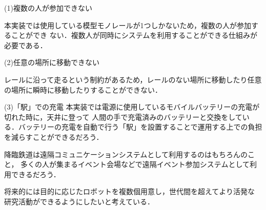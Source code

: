 \documentclass[submit,techreq]{ipsj}
\begin{document}
(1)複数の人が参加できない

本実装では使用している模型モノレールが1つしかないため，複数の人が参加することができ
ない．複数人が同時にシステムを利用することができる仕組みが必要である．

(2)任意の場所に移動できない

レールに沿って走るという制約があるため，レールのない場所に移動したり任意の場所に瞬時に移動したりすることができない．

(3)「駅」での充電
本実装では電源に使用しているモバイルバッテリーの充電が切れた時に，天井に登って
人間の手で充電済みのバッテリーと交換をしている．バッテリーの充電を自動で行う「駅」を設置することで運用する上での負担を減らすことができるだろう．

降臨鉄道は遠隔コミュニケーションシステムとして利用するのはもちろんのこと，
多くの人が集まるイベント会場などで遠隔イベント参加システムとして利用できるだろう．

将来的には目的に応じたロボットを複数個用意し，世代間を超えてより活発な
研究活動ができるようにしたいと考えている．

{\scriptsize


}
\end{document}
